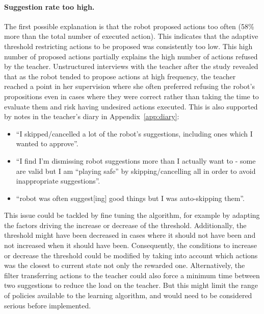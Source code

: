 \paragraph{Suggestion rate too high.}
The first possible explanation is that the robot proposed actions too often (58\% more than the total number of executed action). This indicates that the adaptive threshold restricting actions to be proposed was consistently too low. This high number of proposed actions partially explains the high number of actions refused by the teacher. Unstructured interviews with the teacher after the study revealed that as the robot tended to propose actions at high frequency, the teacher reached a point in her supervision where she often preferred refusing the robot's propositions even in cases where they were correct rather than taking the time to evaluate them and risk having undesired actions executed. This is also supported by notes in the teacher's diary in Appendix~\ref{app:diary}:
\begin{itemize}
	\item ``I skipped/cancelled a lot of the robot’s suggestions, including ones which I wanted to approve''.
	\item ``I find I’m dismissing robot suggestions more than I actually want to - some are valid but I am “playing safe” by skipping/cancelling all in order to avoid inappropriate suggestions''.
	\item ``robot was often suggest[ing] good things but I was auto-skipping them''.
\end{itemize}

This issue could be tackled by fine tuning the algorithm, for example by adapting the factors driving the increase or decrease of the threshold. Additionally, the threshold might have been decreased in cases where it should not have been and not increased when it should have been. Consequently, the conditions to increase or decrease the threshold could be modified by taking into account which actions was the closest to current state not only the rewarded one.
Alternatively, the filter transferring actions to the teacher could also force a minimum time between two suggestions to reduce the load on the teacher. But this might limit the range of policies available to the learning algorithm, and would need to be considered serious before implemented.

